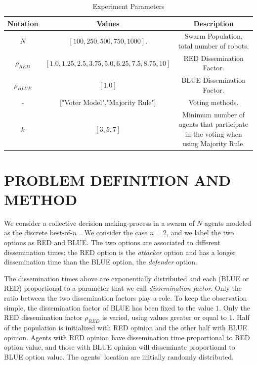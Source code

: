 \documentclass[sigconf]{acmart}
\begin{document}
\begin{table}[t]
\caption{Experiment Parameters}
\label{params-table}
\centering
\begin{tabular}{|c|c|c|}
\hline
Notation
&
Values
&
Description
\\
\hline
$N$
&
$[100, 250, 500, 750, 1000]$.
&
Swarm Population, total number of robots.\\
\hline
$\rho_{RED}$
&
$[1.0, 1.25, 2.5, 3.75, 5.0, 6.25, 7.5, 8.75, 10]$
&
RED Dissemination Factor.\\
\hline
$\rho_{BLUE}$
&
$[1.0]$
&
BLUE Dissemination Factor.\\

\hline
-
&
["Voter Model","Majority Rule"]
&
Voting methods.
\\
\hline
$k$
&
$[3,5,7]$
&
Minimum number of agents that participate in the voting when using Majority Rule.
\\
\hline
\end{tabular}
\end{table}


\section{PROBLEM DEFINITION AND METHOD}
\label{sec:method}

We consider a collective decision making-process in a swarm of $N$ agents modeled as the discrete best-of-$n$~\cite{Valentini2017Review}. We consider the case $n=2$, and we label the two options as RED and BLUE. The two options are associated to different dissemination times: the RED option is the \emph{attacker} option and has a longer dissemination time than the BLUE option, the \emph{defender} option.

The dissemination times above are exponentially distributed and each (BLUE or RED) proportional to a parameter that we call \emph{dissemination factor}.  Only the ratio between the two dissemination factors play a role. %
To keep the observation simple, the dissemination factor of BLUE has been fixed to the value $1$. Only the RED dissemination factor $\rho_{RED}$ is varied, using values greater or equal to $1$. 
Half of the population is initialized with RED opinion and the other half with BLUE opinion. 
Agents with RED opinion have dissemination time  proportional to RED option value, and those with BLUE opinion will disseminate proportional to BLUE option value.  
The agents' location are initially randomly distributed.
\end{document}
